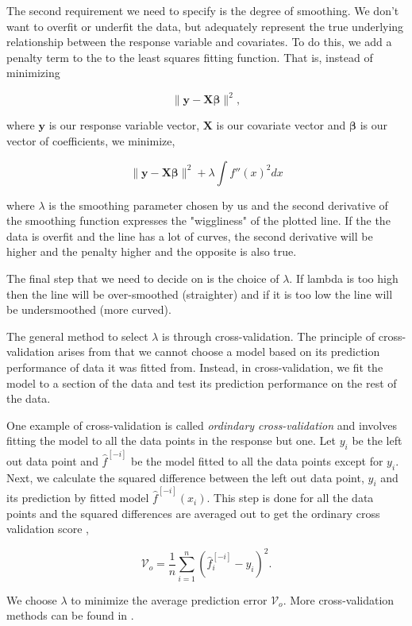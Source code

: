 The second requirement we need to specify is the degree of smoothing. We don't want to overfit or underfit the data, but adequately represent the true underlying relationship between the response variable and covariates. To do this, we add a penalty term to the 
to the least squares fitting function. That is, instead of minimizing 

$$
\|\mathbf{y}-\mathbf{X} \boldsymbol{\beta}\|^{2},
$$


where $\mathbf{y}$ is our response variable vector, $\mathbf{X}$ is our covariate vector and $\boldsymbol{\beta}$ is our vector of coefficients, we minimize, 

$$
\|\mathbf{y}-\mathbf{X} \boldsymbol{\beta}\|^{2} + \lambda \int f''(x)^2 dx 
$$

where $\lambda$ is the smoothing parameter chosen by us and the second derivative of the smoothing function expresses the "wiggliness" of the plotted line. If the the data is overfit and the line has a lot of curves, the second derivative will be higher and the penalty higher and the opposite is also true. 

The final step that we need to decide on is the choice of $\lambda$. If lambda is too high then the line will be over-smoothed (straighter) and if it is too low the line will be undersmoothed (more curved). 


The general method to select $\lambda$ is through cross-validation. The principle of cross-validation arises from that we cannot choose a model based on its prediction performance of data it was fitted from. Instead, in cross-validation, we fit the model to a section of the data and test its prediction performance on the rest of the data. 

 One example of cross-validation is called \textit{ordindary cross-validation} and involves fitting the model to all the data points in the response but one. Let $y_i$ be the left out data point and $\hat{f}^{[-i]}$ be the model fitted to all the data points except for $y_i$. Next, we calculate  the squared difference between the left out data point, $y_i$ and its prediction by fitted model $\hat{f}^{[-i]}(x_i)$.  This step is done for all the data points and the squared differences are averaged out to get the ordinary cross validation score \citep{wood2017generalized}, 

$$
\mathcal{V}_{o}=\frac{1}{n} \sum_{i=1}^{n}\left(\hat{f}_{i}^{[-i]}-y_{i}\right)^{2}.
$$

We choose $\lambda$ to minimize the average prediction error $\mathcal{V}_{o}$. More cross-validation methods can be found in .




